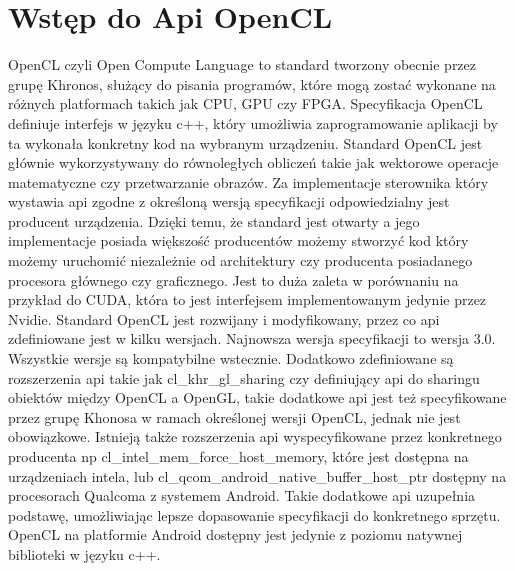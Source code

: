 \section[Wstęp do Api OpenCL]{Wstęp do Api OpenCL}
OpenCL czyli Open Compute Language to standard tworzony obecnie przez grupę Khronos, służący do pisania programów, które mogą zostać wykonane na różnych platformach takich jak CPU, GPU czy FPGA. Specyfikacja OpenCL definiuje interfejs w języku c++, który umożliwia zaprogramowanie aplikacji by ta wykonała konkretny kod na wybranym urządzeniu. Standard OpenCL jest głównie wykorzystywany do równoległych obliczeń takie jak wektorowe operacje matematyczne czy przetwarzanie obrazów. Za implementacje sterownika który wystawia api zgodne z określoną wersją specyfikacji odpowiedzialny jest producent urządzenia.  Dzięki temu, że standard jest otwarty a jego implementacje posiada większość producentów możemy stworzyć kod który możemy uruchomić niezależnie od architektury czy producenta posiadanego procesora głównego czy graficznego. Jest to duża zaleta w porównaniu na przykład do CUDA, która to jest interfejsem implementowanym jedynie przez Nvidie. Standard OpenCL jest rozwijany i modyfikowany, przez co api zdefiniowane jest w kilku wersjach. Najnowsza wersja specyfikacji to wersja 3.0. Wszystkie wersje są kompatybilne wstecznie. Dodatkowo zdefiniowane są rozszerzenia api takie jak cl\_khr\_gl\_sharing czy definiujący api do sharingu obiektów między OpenCL a OpenGL, takie dodatkowe api jest też specyfikowane przez grupę Khonosa w ramach określonej wersji OpenCL, jednak nie jest obowiązkowe. Istnieją także rozszerzenia api wyspecyfikowane przez konkretnego producenta np cl\_intel\_mem\_force\_host\_memory, które jest dostępna na urządzeniach intela, lub cl\_qcom\_android\_native\_buffer\_host\_ptr dostępny na procesorach Qualcoma z systemem Android. Takie dodatkowe api uzupełnia podstawę, umożliwiając lepsze dopasowanie specyfikacji do konkretnego sprzętu. OpenCL na platformie Android dostępny jest jedynie z poziomu natywnej biblioteki w języku c++.

\label{chap:goal}
